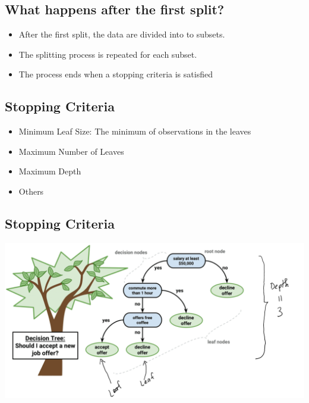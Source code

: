 \documentclass[
]{article}
\providecommand{\tightlist}{%
  \setlength{\itemsep}{0pt}\setlength{\parskip}{0pt}}
\begin{document}
\hypertarget{what-happens-after-the-first-split}{%
\subsection{What happens after the first
split?}\label{what-happens-after-the-first-split}}

\begin{itemize}
\tightlist
\item
  After the first split, the data are divided into to subsets.
\item
  The splitting process is repeated for each subset.
\item
  The process ends when a stopping criteria is satisfied
\end{itemize}

\hypertarget{stopping-criteria}{%
\subsection{Stopping Criteria}\label{stopping-criteria}}

\begin{itemize}
\tightlist
\item
  Minimum Leaf Size: The minimum of observations in the leaves
\item
  Maximum Number of Leaves
\item
  Maximum Depth
\item
  Others
\end{itemize}

\hypertarget{stopping-criteria-1}{%
\subsection{Stopping Criteria}\label{stopping-criteria-1}}

\includegraphics{images/tree6.png}
\end{document}
